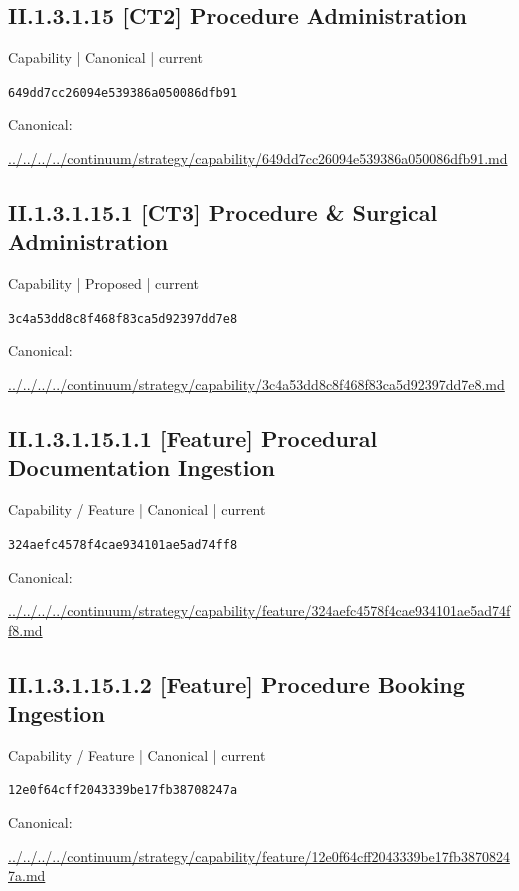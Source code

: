 \documentclass[10pt,a4paper]{article}
\begin{document}
\subsection*{II.1.3.1.15 [CT2] Procedure Administration}
{\small Capability | Canonical | current}\par
\texttt{649dd7cc26094e539386a050086dfb91}\par
Canonical: \par
{\footnotesize\url{../../../../continuum/strategy/capability/649dd7cc26094e539386a050086dfb91.md}}\par
\subsection*{II.1.3.1.15.1 [CT3] Procedure \& Surgical Administration}
{\small Capability | Proposed | current}\par
\texttt{3c4a53dd8c8f468f83ca5d92397dd7e8}\par
Canonical: \par
{\footnotesize\url{../../../../continuum/strategy/capability/3c4a53dd8c8f468f83ca5d92397dd7e8.md}}\par
\subsection*{II.1.3.1.15.1.1 [Feature] Procedural Documentation Ingestion}
{\small Capability / Feature | Canonical | current}\par
\texttt{324aefc4578f4cae934101ae5ad74ff8}\par
Canonical: \par
{\footnotesize\url{../../../../continuum/strategy/capability/feature/324aefc4578f4cae934101ae5ad74ff8.md}}\par
\subsection*{II.1.3.1.15.1.2 [Feature] Procedure Booking Ingestion}
{\small Capability / Feature | Canonical | current}\par
\texttt{12e0f64cff2043339be17fb38708247a}\par
Canonical: \par
{\footnotesize\url{../../../../continuum/strategy/capability/feature/12e0f64cff2043339be17fb38708247a.md}}\par
\end{document}
